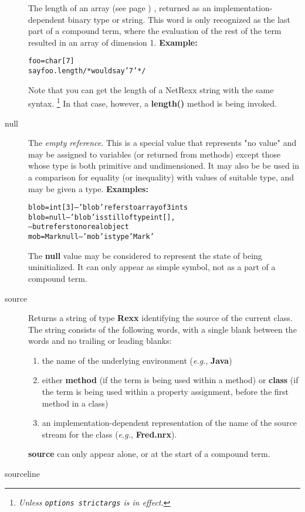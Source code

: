 \begin{description}
The length of an  array (see page \pageref{refarray}) , returned as an
implementation-dependent binary type or string.
This word is only recognized as the last part of a compound term,
where the evaluation of the rest of the term resulted in an array of
dimension 1.
 \textbf{Example:}
\begin{alltt}
foo=char[7]
say foo.length     /* would say '7' */
\end{alltt}
 
Note that you can get the length of a NetRexx string with the
same syntax.
\footnote{
\emph{Unless \texttt{options strictargs} is in effect.
}
}
In that case, however, a \textbf{length()} method is being invoked.
\item[null]\label{refswnull}
 
The \emph{empty reference}.  This is a special value that represents
"no value" and may be assigned to variables (or returned from
methods) except those whose type is both primitive and undimensioned.
It may also be be used in a comparison for equality (or inequality) with
values of suitable type, and may be given a type.
 \textbf{Examples:}
\begin{alltt}
blob=int[3]   -- 'blob' refers to array of 3 ints
blob=null     -- 'blob' is still of type int[],
              -- but refers to no real object
mob=Mark null -- 'mob' is type 'Mark'
\end{alltt}
 The \textbf{null} value may be considered to represent the state of
being uninitialized.  It can only appear as simple symbol, not as a part
of a compound term.
\item[source]\label{refswsourc}
 
Returns a string of type \textbf{Rexx} identifying the source of the
current class.
The string consists of the following words, with a single blank between
the words and no trailing or leading blanks:
\begin{enumerate}
\item the name of the underlying environment (\emph{e.g.}, \textbf{Java})
\item either \textbf{method} (if the term is being used within a method)
or \textbf{class} (if the term is being used within a property
assignment, before the first method in a class)
\item 
an implementation-dependent representation of the name of the
source stream for the class (\emph{e.g.}, \textbf{Fred.nrx}).
\end{enumerate}
 \textbf{source} can only appear alone, or at the start of a
compound term.
\item[sourceline]\label{refswsourl}
 

\end{description}
